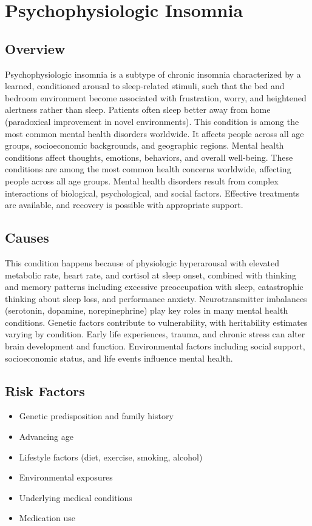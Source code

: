\chapter{Psychophysiologic Insomnia}
\label{sec:Psychophysiologic Insomnia}

\section{Overview}
Psychophysiologic insomnia is a subtype of chronic insomnia characterized by a learned, conditioned arousal to sleep-related stimuli, such that the bed and bedroom environment become associated with frustration, worry, and heightened alertness rather than sleep. Patients often sleep better away from home (paradoxical improvement in novel environments). This condition is among the most common mental health disorders worldwide. It affects people across all age groups, socioeconomic backgrounds, and geographic regions. Mental health conditions affect thoughts, emotions, behaviors, and overall well-being. These conditions are among the most common health concerns worldwide, affecting people across all age groups. Mental health disorders result from complex interactions of biological, psychological, and social factors. Effective treatments are available, and recovery is possible with appropriate support.
\section{Causes}
This condition happens because of physiologic hyperarousal with elevated metabolic rate, heart rate, and cortisol at sleep onset, combined with thinking and memory patterns including excessive preoccupation with sleep, catastrophic thinking about sleep loss, and performance anxiety.  Neurotransmitter imbalances (serotonin, dopamine, norepinephrine) play key roles in many mental health conditions. Genetic factors contribute to vulnerability, with heritability estimates varying by condition. Early life experiences, trauma, and chronic stress can alter brain development and function. Environmental factors including social support, socioeconomic status, and life events influence mental health.   
\section{Risk Factors}
\begin{itemize}[noitemsep]
  \item Genetic predisposition and family history
  \item Advancing age
  \item Lifestyle factors (diet, exercise, smoking, alcohol)
  \item Environmental exposures
  \item Underlying medical conditions
  \item Medication use
\end{itemize}
